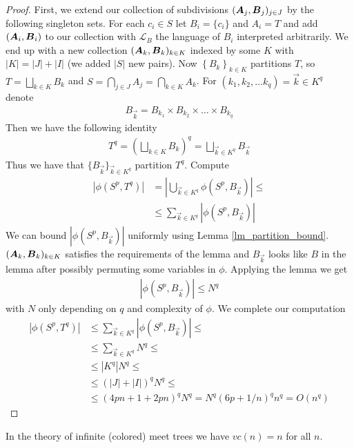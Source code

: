 \documentclass{amsart}
\DeclareMathOperator{\AT}{\boldface A}
\DeclareMathOperator{\BT}{\boldface B}
\renewcommand{\LL}{\mathcal L}
\newcommand{\curly}[1]{\left\{#1\right\}}
\begin{document}
\begin{proof}
  First, we extend our collection of subdivisions $(\AT_j, \BT_j)_{j \in J}$ by the following singleton sets. For each $c_i \in S$ let $B_i = \{c_i\}$ and $A_i = T$ and add $(\AT_i, \BT_i)$ to our collection with $\LL_B$ the language of $B_i$ interpreted arbitrarily. We end up with a new collection $(\AT_k, \BT_k)_{k \in K}$ indexed by some $K$ with $|K| = |J| + |I|$ (we added $|S|$ new pairs). Now $\curly{B_k}_{k \in K}$ partitions $T$, so $T = \bigsqcup_{k \in K} B_k$ and $S = \bigcap_{j \in J} A_j = \bigcap_{k \in K} A_k$. For $(k_1, k_2, \ldots k_q) = \vec k \in K^q$ denote 
  \begin{align*}
    B_{\vec k} = B_{k_1} \times B_{k_2} \times \ldots \times B_{k_q}
  \end{align*}
  Then we have the following identity
  \begin{align*}
    T^q = (\bigsqcup_{k \in K} B_k)^q = \bigsqcup_{\vec k \in K^q} B_{\vec k}
  \end{align*}
  Thus we have that $\{B_{\vec k}\}_{\vec k \in K^q}$ partition $T^q$. Compute
  \begin{align*}
    |\phi(S^p, T^q)|
    &= \left|\bigcup_{\vec k \in K^q} \phi(S^p, B_{\vec k}) \right| \leq \\
    &\leq \sum_{\vec k \in K^q} |\phi(S^p, B_{\vec k})|
  \end{align*}
  We can bound $|\phi(S^p, B_{\vec k})|$ uniformly using Lemma \ref{lm_partition_bound}. $(\AT_k, \BT_k)_{k \in K}$ satisfies the requirements of the lemma and $B_{\vec k}$ looks like $B$ in the lemma after possibly permuting some variables in $\phi$. Applying the lemma we get
  \begin{align*}
    |\phi(S^p, B_{\vec k})| \leq N^q
  \end{align*}
  with $N$ only depending on $q$ and complexity of $\phi$. We complete our computation
  \begin{align*}
    |\phi(S^p, T^q)|
    &\leq \sum_{\vec k \in K^q} |\phi(S^p, B_{\vec k})| \leq \\
    &\leq \sum_{\vec k \in K^q} N^q \leq \\
    &\leq |K^q| N^q \leq \\
    &\leq (|J| + |I|)^q N^q \leq \\
    &\leq (4pn + 1 + 2pn)^q N^q = N^q (6p + 1/n)^q n^q = O(n^q)
  \end{align*}
\end{proof}
\begin{Corollary}
  In the theory of infinite (colored) meet trees we have $vc(n) = n$ for all $n$.
\end{Corollary}
\end{document}
